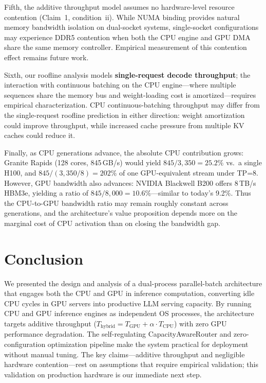 \documentclass[10pt,conference]{IEEEtran}
\begin{document}
Fifth, the additive throughput model assumes no hardware-level resource contention (Claim~1, condition~ii).
While NUMA binding provides natural memory bandwidth isolation on dual-socket systems, single-socket configurations may experience DDR5 contention when both the CPU engine and GPU DMA share the same memory controller.
Empirical measurement of this contention effect remains future work.

Sixth, our roofline analysis models \textbf{single-request decode throughput}; the interaction with continuous batching on the CPU engine---where multiple sequences share the memory bus and weight-loading cost is amortized---requires empirical characterization.
CPU continuous-batching throughput may differ from the single-request roofline prediction in either direction: weight amortization could improve throughput, while increased cache pressure from multiple KV caches could reduce it.

Finally, as CPU generations advance, the absolute CPU contribution grows: Granite Rapids (128 cores, 845\,GB/s) would yield $845/3{,}350 = 25.2\%$ vs.\ a single H100, and $845/(3{,}350/8) = 202\%$ of one GPU-equivalent stream under TP=8.
However, GPU bandwidth also advances: NVIDIA Blackwell B200 offers 8\,TB/s HBM3e, yielding a ratio of $845/8{,}000 = 10.6\%$---similar to today's 9.2\%.
Thus the CPU-to-GPU bandwidth ratio may remain roughly constant across generations, and the architecture's value proposition depends more on the marginal cost of CPU activation than on closing the bandwidth gap.

\section{Conclusion}
\label{sec:conclusion}

We presented the design and analysis of a dual-process parallel-batch architecture that engages both the CPU and GPU in inference computation, converting idle CPU cycles in GPU servers into productive LLM serving capacity.
By running CPU and GPU inference engines as independent OS processes, the architecture targets additive throughput ($T_\text{hybrid} = T_\text{GPU} + \alpha \cdot T_\text{CPU}$) with zero GPU performance degradation.
The self-regulating CapacityAwareRouter and zero-configuration optimization pipeline make the system practical for deployment without manual tuning.
The key claims---additive throughput and negligible hardware contention---rest on assumptions that require empirical validation; this validation on production hardware is our immediate next step.
\end{document}
